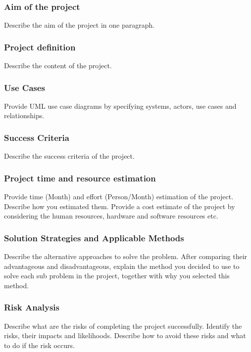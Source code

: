 \documentclass{mefsdp}
\begin{document}
	\subsubsection{Aim of the project}
	Describe the aim of the project in one paragraph.
	
	\subsubsection{Project definition}
	Describe the content of the project. 
	
	\subsubsection{Use Cases}
	Provide UML use case diagrams by specifying systems, actors, use cases and relationships. \cite{kahneman2011thinking}
	
	\subsubsection{Success Criteria}
	Describe the success criteria of the project. 
	
	\subsubsection{Project time and resource estimation}
	Provide time (Month) and effort (Person/Month) estimation of the project. Describe how you estimated them.  Provide a cost estimate of the project by considering the human resources, hardware and software resources etc.
	
	\subsubsection{Solution Strategies and Applicable Methods}
	Describe the alternative approaches to solve the problem. After comparing their advantageous and disadvantageous, explain the method you decided to use to solve each sub problem in the project, together with why you selected this method. 
	
	\subsubsection{Risk Analysis}
	Describe what are the risks of completing the project successfully. Identify the risks, their impacts and likelihoods. Describe how to avoid these risks and what to do if the risk occurs. \cite{duan2017question}
	
\end{document}
